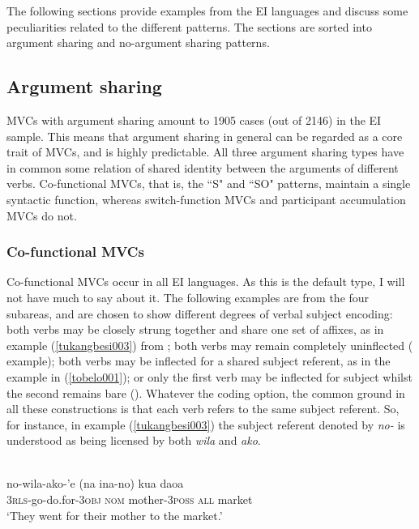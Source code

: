 The following sections provide examples from the EI languages and discuss some peculiarities related to the different patterns. The sections are sorted into argument sharing and no-argument sharing patterns.

\subsection{Argument sharing}

MVCs with argument sharing amount to 1905 cases (out of 2146) in the EI sample. This means that argument sharing in general can be regarded as a core trait of MVCs, and is highly predictable. All three argument sharing types have in common some relation of shared identity between the arguments of different verbs. Co-functional MVCs, that is, the ``S" and ``SO" patterns, maintain a single syntactic function, whereas switch-function MVCs and participant accumulation MVCs do not.

\subsubsection{Co-functional MVCs}

Co-functional MVCs occur in all EI languages. As this is the default type, I will not have much to say about it. The following examples are from the four subareas, and are chosen to show different degrees of verbal subject encoding: both verbs may be closely strung together and share one set of affixes, as in example (\ref{tukangbesi003}) from ; both verbs may remain completely uninflected ( example); both verbs may be inflected for a shared subject referent, as in the  example in (\ref{tobelo001}); or only the first verb may be inflected for subject whilst the second remains bare (). Whatever the coding option, the common ground in all these constructions is that each verb refers to the same subject referent. So, for instance, in example (\ref{tukangbesi003}) the subject referent denoted by \textit{no-} is understood as being licensed by both \textit{wila} and \textit{ako}.

\ea \label{tukangbesi003}
\\
\gll no-wila-ako-'e (na ina-no) kua daoa \\
3\textsc{rls}-go-do.for-3\textsc{obj} \textsc{nom} mother-3\textsc{poss} \textsc{all} market \\
\glft `They went for their mother to the market.'\\ 
\z

